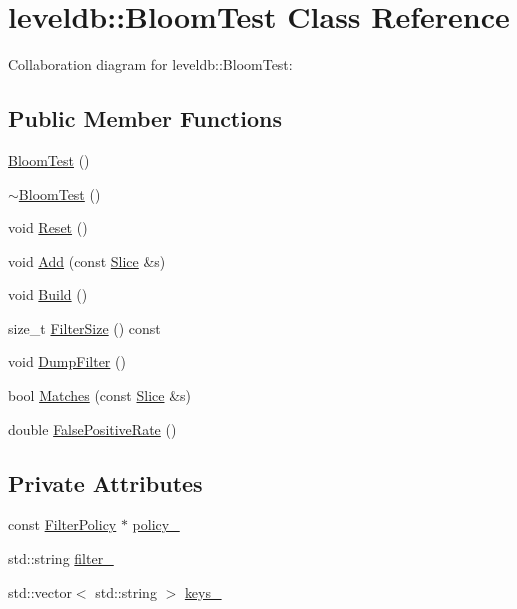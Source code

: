 \hypertarget{classleveldb_1_1_bloom_test}{\section{leveldb\-:\-:Bloom\-Test Class Reference}
\label{classleveldb_1_1_bloom_test}
}


Collaboration diagram for leveldb\-:\-:Bloom\-Test\-:
\subsection*{Public Member Functions}
\begin{DoxyCompactItemize}
\item 
\hyperlink{classleveldb_1_1_bloom_test_a339a382294295be3e78dfccd25b945fc}{Bloom\-Test} ()
\item 
\hyperlink{classleveldb_1_1_bloom_test_a3370b88a1df119a64ced88ac71bfb6e2}{$\sim$\-Bloom\-Test} ()
\item 
void \hyperlink{classleveldb_1_1_bloom_test_a067ba6753890a5a924edd7efaad7187a}{Reset} ()
\item 
void \hyperlink{classleveldb_1_1_bloom_test_a2f7777014cec7c35f85373e2832bfd88}{Add} (const \hyperlink{classleveldb_1_1_slice}{Slice} \&s)
\item 
void \hyperlink{classleveldb_1_1_bloom_test_ad4fc802152c68599c919d33917523d31}{Build} ()
\item 
size\-\_\-t \hyperlink{classleveldb_1_1_bloom_test_accd2f436396b2324d89043c2a97f0c3a}{Filter\-Size} () const 
\item 
void \hyperlink{classleveldb_1_1_bloom_test_a6f210bc2f2e69c0aeb570fa4dbe4d0da}{Dump\-Filter} ()
\item 
bool \hyperlink{classleveldb_1_1_bloom_test_a1d2a9794bd26ac0124a18511689ef211}{Matches} (const \hyperlink{classleveldb_1_1_slice}{Slice} \&s)
\item 
double \hyperlink{classleveldb_1_1_bloom_test_abf887498db753825b308933df22c0bbb}{False\-Positive\-Rate} ()
\end{DoxyCompactItemize}
\subsection*{Private Attributes}
\begin{DoxyCompactItemize}
\item 
const \hyperlink{classleveldb_1_1_filter_policy}{Filter\-Policy} $\ast$ \hyperlink{classleveldb_1_1_bloom_test_aad08549895e8878b853205916a074cde}{policy\-\_\-}
\item 
std\-::string \hyperlink{classleveldb_1_1_bloom_test_a13fbea63f8f60fd3987745a5110084f1}{filter\-\_\-}
\item 
std\-::vector$<$ std\-::string $>$ \hyperlink{classleveldb_1_1_bloom_test_ad368ca79808b8350f679bb5f049d8095}{keys\-\_\-}
\end{DoxyCompactItemize}



